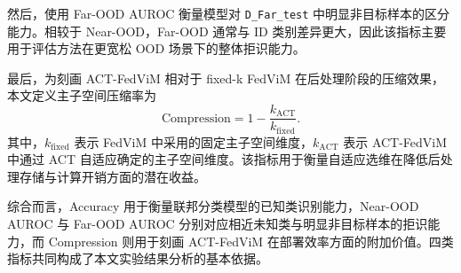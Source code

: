 然后，使用 Far-OOD AUROC 衡量模型对 \texttt{D\_Far\_test} 中明显非目标样本的区分能力。相较于 Near-OOD，Far-OOD 通常与 ID 类别差异更大，因此该指标主要用于评估方法在更宽松 OOD 场景下的整体拒识能力。

最后，为刻画 ACT-FedViM 相对于 fixed-k FedViM 在后处理阶段的压缩效果，本文定义主子空间压缩率为
\[
\text{Compression} = 1 - \frac{k_{\text{ACT}}}{k_{\text{fixed}}}.
\]
其中，$k_{\text{fixed}}$ 表示 FedViM 中采用的固定主子空间维度，$k_{\text{ACT}}$ 表示 ACT-FedViM 中通过 ACT 自适应确定的主子空间维度。该指标用于衡量自适应选维在降低后处理存储与计算开销方面的潜在收益。

综合而言，Accuracy 用于衡量联邦分类模型的已知类识别能力，Near-OOD AUROC 与 Far-OOD AUROC 分别对应相近未知类与明显非目标样本的拒识能力，而 Compression 则用于刻画 ACT-FedViM 在部署效率方面的附加价值。四类指标共同构成了本文实验结果分析的基本依据。
